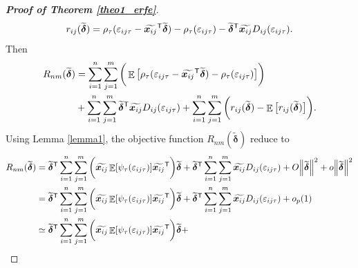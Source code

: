 \documentclass[15pt,a4paper]{article}
\DeclareMathOperator{\E}{\mathbb{E}}
\newcommand{\norm}[1]{\left\lVert#1\right\rVert}
\newcommand{\transpose}{{}^{\text{\sffamily T}}}
\newcommand{\bigO}{O}
\newcommand{\smallO}{o}
\begin{document}
\begin{proof}[\textbf{Proof of Theorem \ref{theo1_erfe}}]
\begin{equation*}
    r_{ij}(\widetilde{\boldsymbol{\delta}})=\rho_\tau(\varepsilon_{ij\tau}-\widetilde{\boldsymbol{x}_{ij}}\transpose
    \widetilde{\boldsymbol{\delta}})-\rho_\tau(\varepsilon_{ij\tau}) - \widetilde{\boldsymbol{\delta}}\transpose\widetilde{\boldsymbol{x}_{ij}} D_{ij}(\varepsilon_{ij\tau}).
\end{equation*}
Then
\begin{equation*}
\begin{split}
    R_{nm}(\widetilde{\boldsymbol{\delta}}) &=\sum_{i=1}^{n}\sum_{j=1}^{m}\bigg(\E\big[\rho_\tau(\varepsilon_{ij\tau}-
\widetilde{\boldsymbol{x}_{ij}}\transpose\widetilde{\boldsymbol{\delta}})-\rho_\tau(\varepsilon_{ij\tau})\big]\bigg) \\
    & + \sum_{i=1}^{n}\sum_{j=1}^{m}\widetilde{\boldsymbol{\delta}}\transpose\widetilde{\boldsymbol{x}_{ij}} D_{ij}(\varepsilon_{ij\tau}) + \sum_{i=1}^{n}\sum_{j=1}^{m} \bigg(r_{ij}(\widetilde{\boldsymbol{\delta}})-\E\big[r_{ij}(\widetilde{\boldsymbol{\delta}})\big]\bigg).
\end{split}
\end{equation*}
Using Lemma \ref{lemma1}, the objective function $R_{nm}(\widetilde{\boldsymbol{\delta}})$ reduce to 
\begin{equation}\label{risk_function1_erfe}
\begin{split}
    R_{nm}(\widetilde{\boldsymbol{\delta}}) &= \widetilde{\boldsymbol{\delta}}\transpose\sum_{i=1}^{n}\sum_{j=1}^{m}\bigg(\widetilde{\boldsymbol{x}_{ij}}
    \E[\psi_\tau(\varepsilon_{ij\tau})]\widetilde{\boldsymbol{x}_{ij}}\transpose\bigg)\widetilde{\boldsymbol{\delta}}+
    \widetilde{\boldsymbol{\delta}}\transpose\sum_{i=1}^{n}\sum_{j=1}^{m}
    \widetilde{\boldsymbol{x}_{ij}}D_{ij}(\varepsilon_{ij\tau}) + \bigO{\norm{\widetilde{\boldsymbol{\delta}}}^2} + \smallO{\norm{\widetilde{\boldsymbol{\delta}}}^2} \\
    &=    \widetilde{\boldsymbol{\delta}}\transpose\sum_{i=1}^{n}\sum_{j=1}^{m}\bigg(\widetilde{\boldsymbol{x}_{ij}}
    \E[\psi_\tau(\varepsilon_{ij\tau})]\widetilde{\boldsymbol{x}_{ij}}\transpose\bigg)\widetilde{\boldsymbol{\delta}}+
    \widetilde{\boldsymbol{\delta}}\transpose\sum_{i=1}^{n}\sum_{j=1}^{m}
    \widetilde{\boldsymbol{x}_{ij}}D_{ij}(\varepsilon_{ij\tau})
    + o_p(1)\\
    & \simeq \widetilde{\boldsymbol{\delta}}\transpose\sum_{i=1}^{n}\sum_{j=1}^{m}\bigg(\widetilde{\boldsymbol{x}_{ij}}
    \E[\psi_\tau(\varepsilon_{ij\tau})]\widetilde{\boldsymbol{x}_{ij}}\transpose\bigg)\widetilde{\boldsymbol{\delta}}+

\end{split}
\end{equation}
\end{proof}
\end{document}
